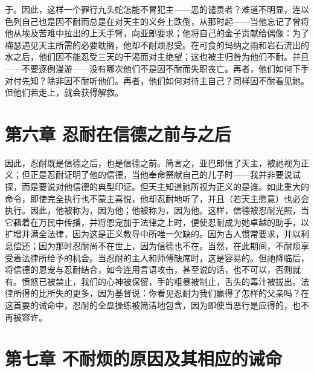 于。因此，这样一个罪行九头蛇怎能不冒犯主——恶的谴责者？难道不明显，连以色列自己也是因不耐而总是在对天主的义务上跌倒，从那时起——当他忘记了曾将他从埃及苦难中拉出的上天手臂，向亚郎要求；他将自己的金子贡献给偶像：为了梅瑟遇见天主所需的必要耽搁，他却不耐烦忍受。在可食的玛纳之雨和岩石流出的水之后，他们因不能忍受三天的干渴而对主绝望；这也被主归咎为他们不耐。并且——不要逐例漫游——没有哪次他们不是因不耐而失职丧亡。再者，他们如何下手对付先知？除非因不耐听他们。再者，他们如何对待主自己？同样因不耐看见祂。但他们若走上，就会获得解救。\par


\section{第六章 忍耐在信德之前与之后}

因此，忍耐既是信德之后，也是信德之前。简言之，亚巴郎信了天主，被祂视为正义；但正是忍耐证明了他的信德，当他奉命祭献自己的儿子时——我并非要说试探，而是要说对他信德的典型印证。但天主知道祂所视为正义的是谁。如此重大的命令，即使完全执行也不蒙主喜悦，他却忍耐地听了，并且（若天主愿意）也必会执行。因此，他被称为，因为他；他被称为，因为他。这样，信德被忍耐光照，当它藉着在万民中传播，并将恩宠加于法律之上时，便使忍耐成为她卓越的助手，以扩增并满全法律，因为这是正义教导中所唯一欠缺的。因为古人惯常要求，并以利息偿还；因为那时忍耐尚不在世上，因为信德也不在。当然，在此期间，不耐烦享受着法律所给予的机会。当忍耐的主人和师傅缺席时，这是容易的。但祂降临后，将信德的恩宠与忍耐结合，如今连用言语攻击，甚至说的话，也不可以，否则就有。愤怒已被禁止，我们的心神被保留，手的粗暴被制止，舌头的毒汁被拔出。法律所得的比所失的更多，因为基督说：你看见忍耐为我们赢得了怎样的父亲吗？在这首要的诫命中，忍耐的全盘操练被简洁地包含，因为即使当恶行是应得的，也不再被容许。\par


\section{第七章 不耐烦的原因及其相应的诫命}

